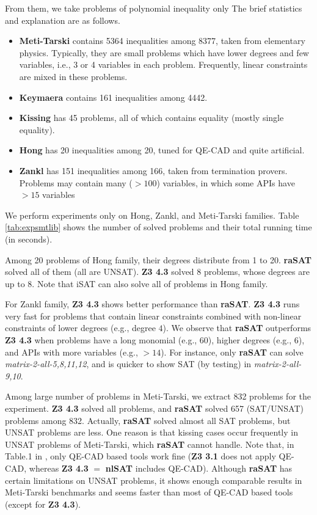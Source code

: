 \documentclass[runningheads,a4paper,oribibl]{llncs}
\begin{document}
From them, we take problems of polynomial inequality only %
The brief statistics and explanation are as follows. 
\begin{itemize}
\item {\bf Meti-Tarski} contains 5364 inequalities among 8377, taken from elementary physics.
Typically, they are small problems which have lower degrees and few variables, 
i.e., 3 or 4 variables in each problem. 
Frequently, linear constraints are mixed in these problems.
\item {\bf Keymaera} contains 161 inequalities among 4442. 
\item {\bf Kissing} has 45 problems, all of which contains equality (mostly single equality). 
\item {\bf Hong} has 20 inequalities among 20, tuned for QE-CAD and quite artificial. 
\item {\bf Zankl} has 151 inequalities among 166, taken from termination provers. 
Problems may contain many ($>100$) variables, in which some APIs have $>15$ variables
\end{itemize}


We perform experiments only on Hong, Zankl, and Meti-Tarski families. 
Table \ref{tab:expsmtlib} shows the number of solved problems and 
their total running time (in seconds). 

Among 20 problems of Hong family, their degrees distribute from 1 to 20. 
{\bf raSAT} solved all of them (all are UNSAT). {\bf Z3 4.3} solved 8 problems, 
whose degrees are up to 8. 
Note that iSAT can also solve all of problems in Hong family. 

For Zankl family,  {\bf Z3 4.3} shows better performance than {\bf raSAT}. 
 {\bf Z3 4.3} runs very fast for problems that contain linear constraints combined with 
non-linear constraints of lower degrees (e.g., degree $4$). 
We observe that {\bf raSAT} outperforms {\bf Z3 4.3} when problems have 
a long monomial (e.g., 60), higher degrees (e.g., 6), and APIs with more variables 
(e.g., $>14$). 
For instance, only {\bf raSAT} can solve \emph{matrix-2-all-5,8,11,12}, and 
is quicker to show SAT (by testing) in \emph{matrix-2-all-9,10}. 

Among large number of problems in Meti-Tarski, 
we extract 832 problems for the experiment. 
\textbf{Z3 4.3} solved all problems, and 
\textbf{raSAT} solved 657 (SAT/UNSAT) problems among 832. 
Actually, \textbf{raSAT} solved almost all SAT problems, 
but UNSAT problems are less. 
One reason is that kissing cases occur frequently in UNSAT problems of Meti-Tarski, 
which \textbf{raSAT} cannot handle. 
Note that, in Table.1 in \cite{Jovanovic13}, only QE-CAD based tools work fine 
(\textbf{Z3 3.1} does not apply QE-CAD, whereas \textbf{Z3 4.3} $=$ \textbf{nlSAT}
includes QE-CAD). 
Although \textbf{raSAT} has certain limitations on UNSAT problems, 
it shows enough comparable results in Meti-Tarski benchmarks 
and seems faster than most of QE-CAD based tools (except for \textbf{Z3 4.3}). 
\end{document}
